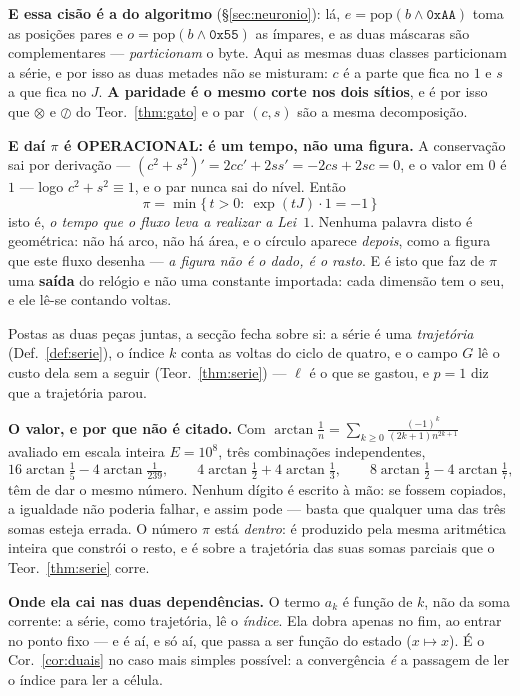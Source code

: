 \documentclass[11pt,a4paper]{article}
\begin{document}
\medskip\noindent\textbf{E essa cisão é a do algoritmo} (§\ref{sec:neuronio}):
lá, $e=\mathrm{pop}(b\wedge\texttt{0xAA})$ toma as posições pares e
$o=\mathrm{pop}(b\wedge\texttt{0x55})$ as ímpares, e as duas máscaras são
complementares --- \emph{particionam} o byte. Aqui as mesmas duas classes
particionam a série, e por isso as duas metades não se misturam: $c$ é a parte
que fica no $1$ e $s$ a que fica no $J$. \textbf{A paridade é o mesmo corte nos
dois sítios}, e é por isso que $\otimes$ e $\oslash$ do Teor.~\ref{thm:gato} e o
par $(c,s)$ são a mesma decomposição.

\medskip\noindent\textbf{E daí $\pi$ é OPERACIONAL: é um tempo, não uma
figura.} A conservação sai por derivação --- $(c^{2}+s^{2})'=2cc'+2ss'=-2cs+2sc
=0$, e o valor em $0$ é $1$ --- logo $c^{2}+s^{2}\equiv1$, e o par nunca sai do
nível. Então
\[
\boxed{\;\pi=\min\{\,t>0:\ \exp(tJ)\cdot 1=-1\,\}\;}
\]
isto é, \emph{o tempo que o fluxo leva a realizar a Lei~$1$}. Nenhuma palavra
disto é geométrica: não há arco, não há área, e o círculo aparece \emph{depois},
como a figura que este fluxo desenha --- \emph{a figura não é o dado, é o rasto}.
E é isto que faz de $\pi$ uma \textbf{saída} do relógio e não uma constante
importada: cada dimensão tem o seu, e ele lê-se contando voltas.

\medskip\noindent Postas as duas peças juntas, a secção fecha sobre si: a série
é uma \emph{trajetória} (Def.~\ref{def:serie}), o índice $k$ conta as voltas do
ciclo de quatro, e o campo $G$ lê o custo dela sem a seguir
(Teor.~\ref{thm:serie}) --- $\ell$ é o que se gastou, e $p=1$ diz que a
trajetória parou.

\medskip\noindent\textbf{O valor, e por que não é citado.} Com
$\arctan\frac1n=\sum_{k\ge0}\frac{(-1)^k}{(2k+1)n^{2k+1}}$ avaliado em escala
inteira $E=10^{8}$, três combinações independentes,
\[
16\arctan\tfrac15-4\arctan\tfrac1{239},\qquad
4\arctan\tfrac12+4\arctan\tfrac13,\qquad
8\arctan\tfrac12-4\arctan\tfrac17,
\]
têm de dar o mesmo número. Nenhum dígito é escrito à mão: se fossem copiados, a
igualdade não poderia falhar, e assim pode --- basta que qualquer uma das três
somas esteja errada. O número $\pi$ está \emph{dentro}: é produzido pela mesma
aritmética inteira que constrói o resto, e é sobre a trajetória das suas somas
parciais que o Teor.~\ref{thm:serie} corre.

\medskip\noindent\textbf{Onde ela cai nas duas dependências.} O termo $a_k$ é
função de $k$, não da soma corrente: a série, como trajetória, lê o
\emph{índice}. Ela dobra apenas no fim, ao entrar no ponto fixo --- e é aí, e só
aí, que passa a ser função do estado ($x\mapsto x$). É o Cor.~\ref{cor:duais} no
caso mais simples possível: a convergência \emph{é} a passagem de ler o índice
para ler a célula.
\end{document}
